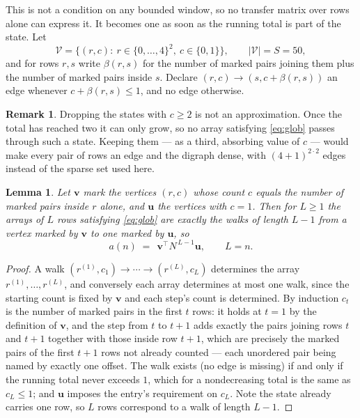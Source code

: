 \documentclass[11pt,a4paper]{article}
\theoremstyle{plain}
\newtheorem{lemma}[theorem]{Lemma}
\theoremstyle{definition}
\newtheorem{remark}[theorem]{Remark}
\begin{document}
This is not a condition on any bounded window, so no transfer matrix over rows alone can
express it. It becomes one as soon as the running total is part of the state. Let
\[
\mathcal V=\bigl\{(r,c):\ r\in\{0,\dots,4\}^{2},\ c\in\{0,1\}\bigr\},
\qquad |\mathcal V|=S=50,
\]
and for rows $r,s$ write $\beta(r,s)$ for the number of marked pairs joining them plus the
number of marked pairs inside $s$. Declare $(r,c)\to(s,c+\beta(r,s))$ an edge whenever
$c+\beta(r,s)\le1$, and no edge otherwise.

\begin{remark}
Dropping the states with $c\ge2$ is not an approximation. Once the total has reached two it
can only grow, so no array satisfying \eqref{eq:glob} passes through such a state. Keeping
them --- as a third, absorbing value of $c$ --- would make every pair of rows an edge and
the digraph dense, with $(4+1)^{2\cdot2}$ edges instead of the sparse set used here.
\end{remark}

\begin{lemma}\label{lem:walk}
Let $\mathbf{v}$ mark the vertices $(r,c)$ whose count $c$ equals the number of marked pairs
inside $r$ alone, and $\mathbf{u}$ the vertices with $c=1$. Then for $L\ge1$ the arrays
of $L$ rows satisfying \eqref{eq:glob} are exactly the walks of length $L-1$ from a
vertex marked by $\mathbf{v}$ to one marked by $\mathbf{u}$, so
\[
a(n)\;=\;\,\mathbf{v}^{\!\top}N^{\,L-1}\mathbf{u},\qquad L=n .
\]
\end{lemma}

\begin{proof}
A walk $(r^{(1)},c_1)\to\cdots\to(r^{(L)},c_L)$ determines the array
$r^{(1)},\dots,r^{(L)}$, and conversely each array determines at most one walk, since the
starting count is fixed by $\mathbf{v}$ and each step's count is determined. By induction
$c_t$ is the number of marked pairs in the first $t$ rows: it holds at $t=1$ by the
definition of $\mathbf{v}$, and the step from $t$ to $t+1$ adds exactly the pairs joining
rows $t$ and $t+1$ together with those inside row $t+1$, which are precisely the marked
pairs of the first $t+1$ rows not already counted --- each unordered pair being named by
exactly one offset. The walk exists (no edge is missing) if and only if the running total
never exceeds $1$, which for a nondecreasing total is the same as $c_L\le1$; and
$\mathbf{u}$ imposes the entry's requirement on $c_L$. Note the state already carries one
row, so $L$ rows correspond to a walk of length $L-1$.
\end{proof}
\end{document}
